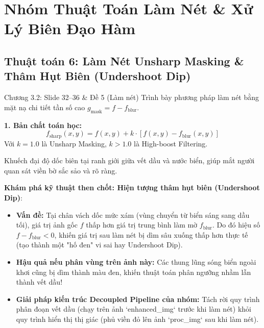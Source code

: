 \documentclass[11pt,a4paper]{article}
\begin{document}
\newpage

\section{Nhóm Thuật Toán Làm Nét \& Xử Lý Biên Đạo Hàm}

\subsection{Thuật toán 6: Làm Nét Unsharp Masking \& Thâm Hụt Biên (Undershoot Dip)}
\begin{slidemapping}{Chương 3.2: Slide 32--36 \& Đề 5 (Làm nét)}
Trình bày phương pháp làm nét bằng mặt nạ chi tiết tần số cao $g_{\text{mask}} = f - f_{\text{blur}}$.
\end{slidemapping}

\textbf{1. Bản chất toán học:}
\begin{equation}
f_{\text{sharp}}(x, y) = f(x, y) + k \cdot \left[ f(x, y) - f_{\text{blur}}(x, y) \right]
\end{equation}
Với $k = 1.0$ là Unsharp Masking, $k > 1.0$ là High-boost Filtering.

\begin{whyuse}
Khuếch đại độ dốc biên tại ranh giới giữa vết dầu và nước biển, giúp mắt người quan sát viền bờ sắc sảo và rõ ràng.
\end{whyuse}

\begin{custombox}
\textbf{Khám phá kỹ thuật then chốt: Hiện tượng thâm hụt biên (Undershoot Dip)}:
\begin{itemize}
    \item \textbf{Vấn đề:} Tại chân vách dốc mức xám (vùng chuyển từ biển sáng sang dầu tối), giá trị ảnh gốc $f$ thấp hơn giá trị trung bình làm mờ $f_{\text{blur}}$. Do đó hiệu số $f - f_{\text{blur}} < 0$, khiến giá trị sau làm nét bị dìm sâu xuống thấp hơn thực tế (tạo thành một "hố đen" vi sai hay Undershoot Dip).
    \item \textbf{Hậu quả nếu phân vùng trên ảnh này:} Các thung lũng sóng biển ngoài khơi cũng bị dìm thành màu đen, khiến thuật toán phân ngưỡng nhầm lẫn thành vết dầu!
    \item \textbf{Giải pháp kiến trúc Decoupled Pipeline của nhóm:} Tách rời quy trình phân đoạn vết dầu (chạy trên ảnh `enhanced_img` trước khi làm nét) khỏi quy trình hiển thị thị giác (phủ viền đỏ lên ảnh `proc_img` sau khi làm nét).
\end{itemize}
\end{custombox}
\end{document}
